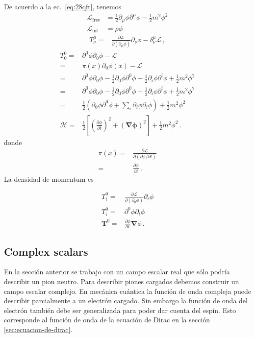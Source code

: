 De acuerdo a la ec.~\eqref{eq:28qft}, tenemos
\begin{align}
\mathcal{L}_{\text{free}}&=\frac{1}{2}\partial_\mu\phi\partial^\mu\phi-\frac{1}{2} m^2\phi^2\nonumber\\
\label{eq:31qft}
\mathcal{L}_{\text{int}}&=\rho\phi
\end{align}
\begin{align}
  T^\mu_\nu=&\frac{\partial\mathcal{L}}{\partial(\partial_\mu\phi)}{\partial_\nu\phi}-\delta^\mu_\nu\mathcal{L}\,,
\end{align}
\begin{align}
    T^0_0=&\partial^0\phi\partial_0\phi-\mathcal{L}\nonumber\\
    =&\pi(x)\partial_0\phi(x)-\mathcal{L}\nonumber\\
=&\partial^0\phi\partial_0\phi-\frac{1}{2}\partial_0\phi\partial^0\phi-\frac{1}{2}\partial_i\phi\partial^i\phi+\frac{1}{2}m^2\phi^2\nonumber\\
    =&\partial^0\phi\partial_0\phi-\frac{1}{2}\partial_0\phi\partial^0\phi-\frac{1}{2}\partial_i\phi\partial^i\phi+\frac{1}{2}m^2\phi^2\nonumber\\
    =&\frac{1}{2}\left(\partial_0\phi\partial^0\phi+\sum_i\partial_i\phi\partial_i\phi\right)+\frac{1}{2}m^2\phi^2\nonumber\\
   \mathcal{H} =&\frac{1}{2}\left[\left(\frac{\partial\phi}{\partial t}\right)^2+
      \left(\boldsymbol{\nabla\phi}\right)^2\right]+\frac{1}{2}m^2\phi^2\,.
\end{align}
donde
\begin{align}
  \pi(x)=&\frac{\partial\mathcal{L}}{\partial\left(\partial\phi/\partial t\right)}\nonumber\\
  =&\frac{\partial\phi}{\partial t}\,.
\end{align}
La densidad de momentum es

\begin{align}
  T^0_i=&\frac{\partial\mathcal{L}}{\partial(\partial_0\phi)}{\partial_i\phi}\nonumber\\
  T^0_i=&\partial^0\phi{\partial_i\phi}\nonumber\\
  \mathbf{T}^0=&\frac{\partial\phi}{\partial t}{\boldsymbol{\nabla}\phi}\,.
\end{align}

\subsection{Complex scalars}
En la sección anterior se trabajo con un campo escalar real que sólo podría describir un pion neutro. Para describir piones cargados debemos construir un campo escalar complejo. En mecánica cuántica la función de onda compleja puede describir parcialmente a un electrón cargado. Sin embargo la función de onda del electrón también debe ser generalizada para poder dar cuenta del espín. Esto corresponde al función de onda de la ecuación de Dirac en la sección \ref{sec:ecuacion-de-dirac}.

